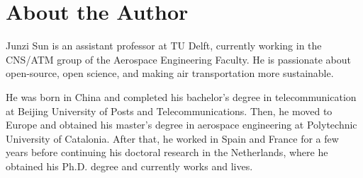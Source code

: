 \chapter*{About the Author}

Junzi Sun is an assistant professor at TU Delft, currently working in the CNS/ATM group of the Aerospace Engineering Faculty. He is passionate about open-source, open science, and making air transportation more sustainable.

He was born in China and completed his bachelor’s degree in telecommunication at Beijing University of Posts and Telecommunications. Then, he moved to Europe and obtained his master’s degree in aerospace engineering at Polytechnic University of Catalonia. After that, he worked in Spain and France for a few years before continuing his doctoral research in the Netherlands, where he obtained his Ph.D. degree and currently works and lives.
